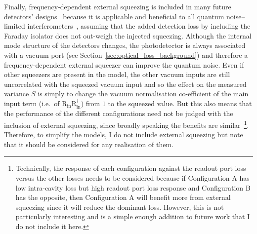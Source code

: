Finally, frequency-dependent external squeezing is included in many future detectors' designs~\cite{} because it is applicable and beneficial to all quantum noise--limited interferometers~\cite{}, assuming that the added detection loss by including the Faraday isolator does not out-weigh the injected squeezing. Although the internal mode structure of the detectors changes, the photodetector is always associated with a vacuum port (see Section~\ref{sec:optical_loss_background}) and therefore a frequency-dependent external squeezer can improve the quantum noise. Even if other squeezers are present in the model, the other vacuum inputs are still uncorrelated with the squeezed vacuum input and so the effect on the measured variance $S$ is simply to change the vacuum normalisation co-efficient of the main input term (i.e.\ of $\text{R}_\text{in} \text{R}_\text{in}^\dag$) from $1$ to the squeezed value. But this also means that the performance of the different configurations need not be judged with the inclusion of external squeezing, since broadly speaking the benefits are similar~\footnote{Technically, the response of each configuration against the readout port loss versus the other losses needs to be considered because if Configuration A has low intra-cavity loss but high readout port loss response and Configuration B has the opposite, then Configuration A will benefit more from external squeezing since it will reduce the dominant loss. However, this is not particularly interesting and is a simple enough addition to future work that I do not include it here.}. Therefore, to simplify the models, I do not include external squeezing but note that it should be considered for any realisation of them.





